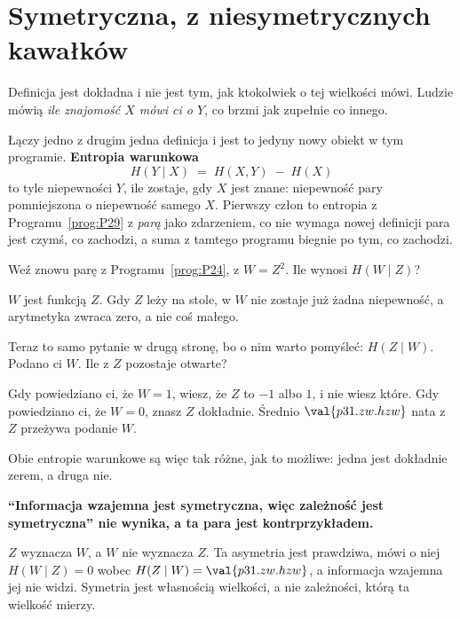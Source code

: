 \section{Symetryczna, z niesymetrycznych kawałków}
\label{sec:P31-conditional}

\begin{fr}
Definicja jest dokładna i nie jest tym, jak ktokolwiek o tej wielkości mówi.
Ludzie mówią \emph{ile znajomość $X$ mówi ci o $Y$}, co brzmi jak zupełnie
co innego.

Łączy jedno z drugim jedna definicja i jest to jedyny nowy obiekt w tym
programie. \textbf{Entropia warunkowa}
\[ H(Y \mid X) \;=\; H(X, Y) \;-\; H(X) \]
to tyle niepewności $Y$, ile zostaje, gdy $X$ jest znane: niepewność pary
pomniejszona o niepewność samego $X$. Pierwszy człon to entropia z
Programu~\ref{prog:P29} z \emph{parą} jako zdarzeniem, co nie wymaga nowej
definicji \dash{} para jest czymś, co zachodzi, a suma z tamtego programu
biegnie po tym, co zachodzi.

Weź znowu parę z Programu~\ref{prog:P24}, z $W = Z^{2}$. Ile wynosi
$H(W \mid Z)$?
\dotline
\nextframe
\end{fr}

\begin{fr}

$W$ jest funkcją $Z$. Gdy $Z$ leży na stole, w $W$ nie zostaje już żadna
niepewność, a arytmetyka zwraca zero, a nie coś małego.

Teraz to samo pytanie w drugą stronę, bo o nim warto pomyśleć:
$H(Z \mid W)$. Podano ci $W$. Ile z $Z$ pozostaje otwarte?
\dotline
\nextframe
\end{fr}

\begin{fr}

Gdy powiedziano ci, że $W = 1$, wiesz, że $Z$ to $-1$ albo $1$, i nie wiesz
które. Gdy powiedziano ci, że $W = 0$, znasz $Z$ dokładnie. Średnio
$\val{p31.zw.hzw}$ nata z $Z$ przeżywa podanie $W$.

Obie entropie warunkowe są więc tak różne, jak to możliwe: jedna jest
dokładnie zerem, a druga nie.

\begin{trapbox}
\textbf{\enquote{Informacja wzajemna jest symetryczna, więc zależność jest
symetryczna} nie wynika, a ta para jest kontrprzykładem.}

$Z$ wyznacza $W$, a $W$ nie wyznacza $Z$. Ta asymetria jest prawdziwa, mówi
o niej $H(W \mid Z) = 0$ wobec $H(Z \mid W) = \val{p31.zw.hzw}$, a
informacja wzajemna jej nie widzi. Symetria jest własnością wielkości, a nie
zależności, którą ta wielkość mierzy.
\end{trapbox}
\end{fr}

